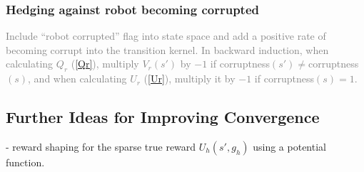 \documentclass[letterpaper]{article} %
\def\gray#1{\textcolor{gray}{#1}}
\begin{document}
\subsubsection*{Hedging against robot becoming corrupted}
\gray{
Include ``robot corrupted'' flag into state space and add a positive rate of becoming corrupt into the transition kernel.
In backward induction, when calculating $Q_r$ (\eqref{Qr}), multiply $V_r(s')$ by $-1$ if corruptness$(s')\neq$corruptness$(s)$, 
and when calculating $U_r$ (\eqref{Ur}), multiply it by $-1$ if corruptness$(s)=1$. 
}



\subsection*{Further Ideas for Improving Convergence}

- reward shaping for the sparse true reward $U_h(s',g_h)$ using a potential function.
\end{document}
